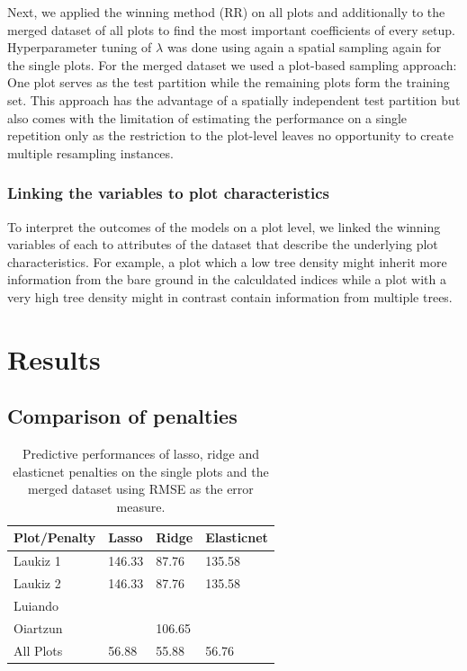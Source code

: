 \documentclass[review]{elsarticle}
\begin{document}
Next, we applied the winning method (\ac{RR}) on all plots and additionally to the merged dataset of all plots to find the most important coefficients of every setup.
Hyperparameter tuning of $\lambda$ was done using again a spatial sampling again for the single plots.
For the merged dataset we used a plot-based sampling approach: One plot serves as the test partition while the remaining plots form the training set.
This approach has the advantage of a spatially independent test partition but also comes with the limitation of estimating the performance on a single repetition only as the restriction to the plot-level leaves no opportunity to create multiple resampling instances.

\subsubsection{Linking the variables to plot characteristics}

To interpret the outcomes of the models on a plot level, we linked the winning variables of each to attributes of the dataset that describe the underlying plot characteristics.
For example, a plot which a low tree density might inherit more information from the bare ground in the calculdated indices while a plot with a very high tree density might in contrast contain information from multiple trees.


\section{Results}

\subsection{Comparison of penalties}

\begin{table}[b!]
\centering
\caption[t]{Predictive performances of lasso, ridge and elasticnet penalties on the single plots and the merged dataset using \ac{RMSE} as the error measure.}
\begingroup\footnotesize
\begin{tabular}{llll}
	\\
	Plot/Penalty & Lasso  & Ridge  & Elasticnet \\
	\hline
	Laukiz 1     & 146.33 & 87.76  & 135.58     \\
	Laukiz 2     & 146.33 & 87.76  & 135.58     \\
	Luiando      &        &        &            \\
	Oiartzun     &        & 106.65 &            \\
	All Plots    & 56.88  & 55.88  & 56.76      \\
	\bottomrule
\end{tabular}
\endgroup
\label{tab:penalty_comparison}
\end{table}
\end{document}
